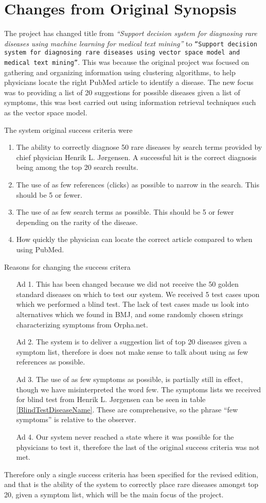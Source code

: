 \chapter*{Changes from Original Synopsis}

The project has changed title from \textit{``Support decision system
  for diagnosing rare diseases using machine learning for medical text
  mining''} to \texttt{``Support decision system for diagnosing rare
  diseases using vector space model and \\ medical text
  mining''}. This was because the original project was focused on
gathering and organizing information using clustering algorithms, to
help physicians locate the right PubMed article to identify a
disease. The new focus was to providing a list of 20 suggestions for
possible diseases given a list of symptoms, this was best carried out using
information retrieval techniques such as the vector space model.

The system original success criteria were
\begin{enumerate}
\item The ability to correctly diagnose 50 rare diseases by search
  terms provided by chief physician Henrik L. J\o rgensen. A
  successful hit is the correct diagnosis being among the top 20
  search results.
\item The use of as few references (clicks) as possible to narrow in
  the search. This should be 5 or fewer.
\item The use of as few search terms as possible. This should be 5 or
  fewer depending on the rarity of the disease.
\item How quickly the physician can locate the correct article
  compared to when using PubMed.
\end{enumerate}

Reasons for changing the success critera
\begin{itemize}
\item[Ad 1.] This has been changed because we did not receive the 50 golden
standard diseases on which to test our system. We received 5 test
cases upon which we performed a blind test. The lack of test cases made
us look into alternatives which we found in BMJ, and some randomly
chosen strings characterizing symptoms from Orpha.net.

\item[Ad 2.] The system is to deliver a suggestion list of top 20 diseases given a
symptom list, therefore is does not make sense to talk about using as
few references as possible.

\item[Ad 3.] The use of as few symptoms as possible, is partially still in effect,
though we have misinterpreted the word few. The symptoms lists we
received for blind test from Henrik L. J\o rgensen can be seen in
table \ref{BlindTestDiseaseName}. These are comprehensive, so the
phrase ``few symptoms'' is relative to the observer.

\item[Ad 4.] Our system never reached a state where it was possible for the
physicians to test it, therefore the last of the original success
criteria was not met.
\end{itemize}

Therefore only a single success criteria has been specified for the revised
edition, and that is the ability of the system to correctly place rare
diseases amongst top 20, given a symptom list, which will be the main
focus of the project.
